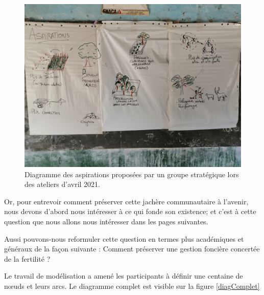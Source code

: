\begin{figure}[h!]
  \begin{center}
  \includegraphics[width=15cm]{img/aspiration_formulee.jpg}
  \end{center}
  \caption{Diagramme des aspirations proposées par un groupe stratégique lors des ateliers d'avril 2021.}
  \label{aspiration}
\end{figure}


Or, pour entrevoir comment préserver cette jachère communautaire à l'avenir, nous devons d'abord nous intéresser à ce qui fonde son existence; et c'est à cette question que nous allons nous intéresser dans les pages suivantes.


Aussi pouvons-nous reformuler cette question en termes plus académiques et généraux de la façon suivante :
Comment préserver une gestion foncière concertée de la fertilité ?



Le travail de modélisation a amené les participants à définir une centaine de nœuds et leurs arcs. Le diagramme complet est visible sur la figure \ref{diagComplet}


